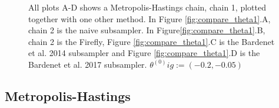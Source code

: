 \begin{figure}
    \caption{All plots A-D shows a Metropolis-Hastings chain, chain 1, plotted together with one other method. In Figure \ref{fig:compare_theta1}.A, chain 2 is the naive subsampler. In Figure\ref{fig:compare_theta1}.B, chain 2 is the Firefly, Figure \ref{fig:compare_theta1}.C is the Bardenet et al. 2014 subsampler and Figure \ref{fig:compare_theta1}.D is the Bardenet et al. 2017 subsampler. $\theta
   ^{\left(0\right)} ig:= \left(-0.2, -0.05\right)$}%
    \label{fig:compare_tfheta1_normal}%
\end{figure}


\subsection*{Metropolis-Hastings}\label{subsec:mh_sim}
